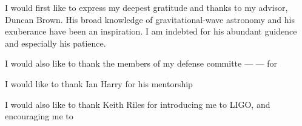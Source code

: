 
\noindent I would first like to express my deepest gratitude and thanks to my advisor,
Duncan Brown. His broad knowledge of gravitational-wave astronomy and his
exuberance have been an inspiration. I am indebted for his abundant guidence and
especially his patience.

\noindent I would also like to thank the members of my defense committe --- 
--- for 

\noindent I would like to thank Ian Harry for his mentorship

\noident I would also like to thank Keith Riles for introducing me to LIGO,
and encouraging me to 
 
